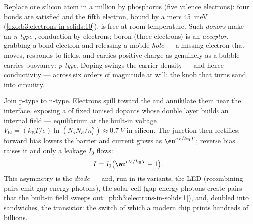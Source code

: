 \begin{definition}[Doping]\label{def:b3:electrons-in-solids:doping}
Replace one silicon atom in a million by phosphorus (five valence
electrons): four bonds are satisfied and the fifth electron,
bound by a mere \qty{45}{meV}
(\cref{exo:b3:electrons-in-solids:10}), is free at room
temperature. Such \emph{donors} make an \emph{n-type}
, conduction by electrons; boron (three electrons)
is an \emph{acceptor}, grabbing a bond electron and releasing a
mobile \emph{hole} --- a missing electron that moves, responds to
fields, and carries positive charge as genuinely as a bubble
carries buoyancy: \emph{p-type}. Doping swings the carrier density
--- and hence conductivity --- across six orders of magnitude at
will: the knob that turns sand into circuitry.
\end{definition}

\begin{proposition}\label{prop:b3:electrons-in-solids:junction}
Join p-type to n-type. Electrons spill toward the  and
annihilate them near the interface, exposing a \emph{} of fixed ionised dopants whose double layer builds an
internal field --- equilibrium at the built-in voltage
$V_{\text{bi}} = (k_{\text{B}}T/e)
\ln(N_{\text{a}}N_{\text{d}}/n_{\text{i}}^2) \approx
\qty{0.7}{V}$ in silicon. The junction then rectifies: forward
bias lowers the barrier and current grows as
$\eu^{eV/k_{\text{B}}T}$; reverse bias raises it and only a
leakage $I_0$ flows:
\[
I = I_0\big(\eu^{eV/k_{\text{B}}T} - 1\big) .
\]
This asymmetry is the \emph{diode} --- and, run in its variants,
the LED (recombining pairs emit gap-energy photons), the solar
cell (gap-energy photons create pairs that the built-in field
sweeps out: \cref{pb:b3:electrons-in-solids:1}), and, doubled
into sandwiches, the transistor: the switch of which a modern
chip prints hundreds of billions.
\end{proposition}
\admitted

